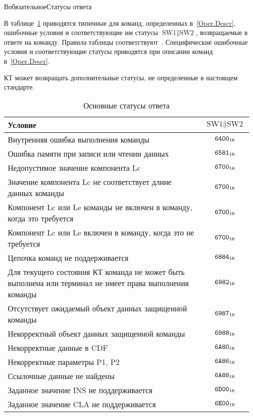 \begin{appendix}{В}{обязательное}{Статусы ответа}
\label{ERRORS}

В таблице~\ref{Table.Errors.General} приводятся типичные для команд, 
определенных в~\ref{Oper.Descr},
ошибочные условия и соответствующие им 
статусы $\text{SW1} \parallel \text{SW2}$,
возвращаемые в ответе на команду.
Правила таблицы соответствуют~\cite{APDU}.
%
Специфические ошибочные условия и соответствующие статусы приводятся 
при описании команд в~\ref{Oper.Descr}.

КТ может возвращать дополнительные статусы,
не определенные в настоящем стандарте.

\begin{table}[hbt]
\caption{Основные статусы ответа}
\label{Table.Errors.General}
\begin{tabular}{|p{14cm}|c|}
\hline
Условие & $\text{SW1} \parallel \text{SW2}$\\
\hline
\hline
Внутренняя ошибка выполнения команды & $\texttt{6400}_{16}$ \\
\hline
Ошибка памяти при записи или чтении данных & $\texttt{6581}_{16}$ \\
\hline
Недопустимое значение компонента Lc & $\texttt{6700}_{16}$ \\
\hline
Значение компонента Lc не соответствует длине данных команды& $\texttt{6700}_{16}$ \\
\hline
Компонент Lc или Le команды не включен в команду, 
когда это требуется& $\texttt{6700}_{16}$ \\
\hline
Компонент Lc или Le включен в команду, 
когда это не требуется& $\texttt{6700}_{16}$ \\
\hline
Цепочка команд не поддерживается & $\texttt{6884}_{16}$ \\
\hline
Для текущего состояния КТ команда не может быть выполнена
или терминал не имеет права выполнения команды & $\texttt{6982}_{16}$ \\
\hline
Отсутствует ожидаемый объект данных защищенной 
команды & $\texttt{6987}_{16}$ \\
\hline
Некорректный объект данных защищенной команды & $\texttt{6988}_{16}$ \\
\hline
Некорректные данные в CDF & $\texttt{6A80}_{16}$ \\
\hline
Некорректные параметры P1, P2 & $\texttt{6A86}_{16}$ \\
\hline
Ссылочные данные не найдены & $\texttt{6A88}_{16}$ \\
\hline
Заданное значение INS не поддерживается & $\texttt{6D00}_{16}$ \\
\hline
Заданное значение CLA не поддерживается & $\texttt{6E00}_{16}$ \\
\hline
\end{tabular}
\end{table}

\mbox{}
\vfill
\mbox{}
\clearpage

\end{appendix}